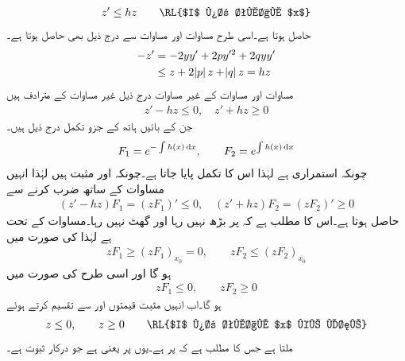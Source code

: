 \begin{align}\label{مساوات_ضمیمہ_شرط_الف}
z' \le hz\quad \quad \text{\RL{$I$ پر تمام $x$}}
\end{align}
حاصل ہوتا  ہے۔اسی طرح مساوات  اور مساوات  سے درج ذیل بھی حاصل ہوتا ہے۔
\begin{gather}
\begin{aligned}\label{مساوات_ضمیمہ_شرط_ب}
-z'&=-2yy'+2py'^2+2qyy'\\
& \le z+2\abs{p}z+\abs{q}z=hz
\end{aligned}
\end{gather}
مساوات  اور مساوات  کے غیر مساوات  درج ذیل غیر مساوات کے مترادف ہیں
\begin{align}\label{مساوات_ضمیمہ_شرط_پ}
z'-hz \le 0, \quad z'+hz\ge 0
\end{align}
جن کے بائیں ہاتھ کے جزو تکمل درج ذیل ہیں۔
\begin{align*}
F_1=e^{-\int h(x)\dif x}, \quad \quad F_2=e^{\int h(x)\dif x}
\end{align*}
چونکہ  استمراری ہے لہٰذا اس کا تکمل پایا جاتا ہے۔چونکہ  اور  مثبت ہیں لہٰذا انہیں مساوات  کے ساتھ ضرب کرنے سے
\begin{align*}
(z'-hz)F_1=(zF_1)' \le 0, \quad  (z'+hz)F_2=(zF_2)' \ge 0
\end{align*}
حاصل ہوتا ہے۔اس کا مطلب ہے کہ  پر  بڑھ نہیں رہا اور  گھٹ نہیں رہا۔مساوات  کے تحت  ہے  لہٰذا  کی صورت میں
\begin{align}
zF_1 \ge (zF_1)_{x_0}=0, \quad \quad zF_2\le (zF_2)_{x_0}
\end{align}
ہو گا اور اسی طرح  کی صورت میں
\begin{align}
zF_1\le 0, \quad \quad zF_2 \ge 0
\end{align}
ہو گا۔اب انہیں مثبت قیمتوں  اور  سے تقسیم کرتے ہوئے
\begin{align}
z\le 0, \quad \quad z \ge 0 \quad \quad \text{\RL{$I$ پر تمام $x$ کے لئے}}
\end{align}
ملتا ہے جس کا مطلب ہے کہ  پر  ہے۔یوں  پر   یعنی  ہے جو درکار ثبوت ہے۔
